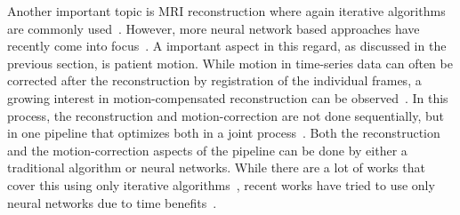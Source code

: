 Another important topic is MRI reconstruction where again iterative algorithms are commonly used~\cite{AdvancesPI,CS-MRI,ParallelMRI,GRAPPA}. However, more neural network based approaches have recently come into focus~\cite{DeepMRIReconstructionSubsampling, DeepMRIReconstructionRadialSubsampling}. A important aspect in this regard, as discussed in the previous section, is patient motion. While motion in time-series data can often be corrected after the reconstruction by registration of the individual frames, a growing interest in motion-compensated reconstruction can be observed~\cite{Oksuz2020}. In this process, the reconstruction and motion-correction are not done sequentially, but in one pipeline that optimizes both in a joint process~\cite{Kuestner2022}. Both the reconstruction and the motion-correction aspects of the pipeline can be done by either a traditional algorithm or neural networks. While there are a lot of works that cover this using only iterative algorithms~\cite{GRICS}, recent works have tried to use only neural networks due to time benefits~\cite{Pan2024,Zou2024}.


